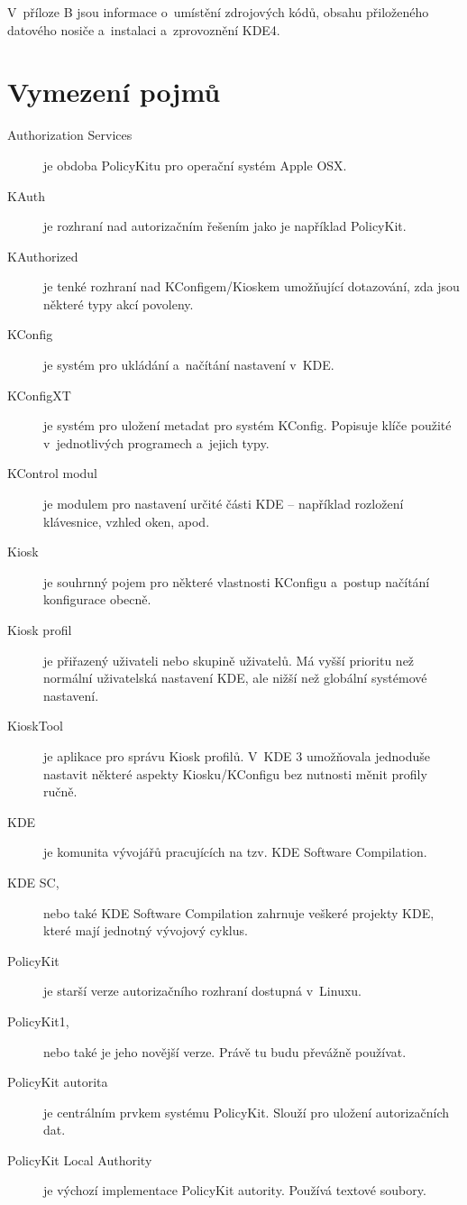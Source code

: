 V~příloze B jsou informace o~umístění zdrojových kódů, obsahu přiloženého datového nosiče a~instalaci a~zprovoznění KDE4.

\appendix
\chapter{Vymezení pojmů}\label{pojmySeznam}
\begin{description}
\item[Authorization Services] je obdoba PolicyKitu pro operační systém Apple OSX.
\item[KAuth] je rozhraní nad autorizačním řešením jako je například PolicyKit.
\item[KAuthorized] je tenké rozhraní nad KConfigem/Kioskem umožňující dotazování, zda jsou některé typy akcí povoleny.
\item[KConfig] je systém pro ukládání a~načítání nastavení v~KDE.
\item[KConfigXT] je systém pro uložení metadat pro systém KConfig. Popisuje klíče použité v~jednotlivých programech a~jejich typy.
\item[KControl modul] je modulem pro nastavení určité části KDE -- například rozložení klávesnice, vzhled oken, apod.
\item[Kiosk] je souhrnný pojem pro některé vlastnosti KConfigu a~postup načítání konfigurace obecně.
\item[Kiosk profil] je přiřazený uživateli nebo skupině uživatelů. Má vyšší prioritu než normální uživatelská nastavení KDE, ale nižší než globální systémové nastavení.
\item[KioskTool] je aplikace pro správu Kiosk profilů. V~KDE 3 umožňovala jednoduše nastavit některé aspekty Kiosku/KConfigu bez nutnosti měnit profily ručně.
\item[KDE] je komunita vývojářů pracujících na tzv. KDE Software Compilation.
\item[KDE SC,] nebo také KDE Software Compilation zahrnuje veškeré projekty KDE, které mají jednotný vývojový cyklus.
\item[PolicyKit] je starší verze autorizačního rozhraní dostupná v~Linuxu.
\item[PolicyKit1,] nebo také  je jeho novější verze. Právě tu budu převážně používat.
\item[PolicyKit autorita] je centrálním prvkem systému PolicyKit. Slouží pro uložení autorizačních dat.
\item[PolicyKit Local Authority] je výchozí implementace PolicyKit autority. Používá textové soubory.

\end{description}
